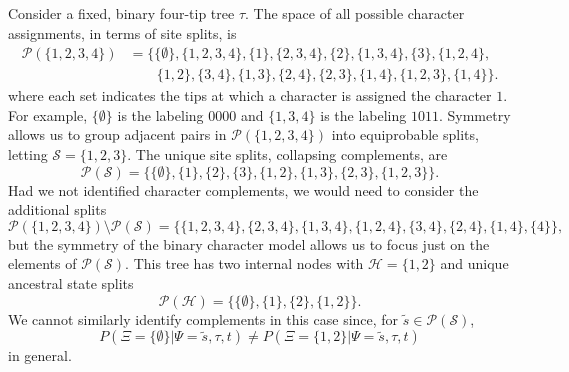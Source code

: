 \documentclass[a4paper]{article}
\newcommand{\siteSplit}{\tilde{s}}
\newcommand{\siteSplitSet}{\mathcal{S}}
\newcommand{\ancestralSplitSet}{\mathcal{H}}
\newcommand{\siteSplitRV}{\Psi}
\newcommand{\ancestralSplitRV}{\Xi}
\begin{document}
Consider a fixed, binary four-tip tree $\tau$.
The space of all possible character assignments, in terms of site splits, is
\begin{align*}
\mathcal{P}(\{1,2,3,4\}) &= \{\{\emptyset\}, \{1,2,3,4\}, \{1\}, \{2,3,4\}, \{2\}, \{1,3,4\}, \{3\}, \{1,2,4\}, \\
                         &\qquad \{1,2\}, \{3,4\}, \{1,3\}, \{2,4\}, \{2,3\}, \{1,4\}, \{1,2,3\}, \{1,4\}\}.
\end{align*}
where each set indicates the tips at which a character is assigned the character $1$.
For example, $\{\emptyset\}$ is the labeling $0000$ and $\{1,3,4\}$ is the labeling $1011$.
Symmetry allows us to group adjacent pairs in $\mathcal{P}(\{1,2,3,4\})$ into equiprobable splits, letting $\siteSplitSet=\{1,2,3\}$.
The unique site splits, collapsing complements, are
$$
\mathcal{P}(\siteSplitSet) = \{\{\emptyset\}, \{1\}, \{2\}, \{3\}, \{1,2\}, \{1,3\}, \{2,3\}, \{1,2,3\}\}.
$$
Had we not identified character complements, we would need to consider the additional splits
$$
\mathcal{P}(\{1,2,3,4\}) \setminus \mathcal{P}(\siteSplitSet) = \{\{1,2,3,4\}, \{2,3,4\}, \{1,3,4\}, \{1,2,4\}, \{3,4\}, \{2,4\}, \{1,4\}, \{4\}\},
$$
but the symmetry of the binary character model allows us to focus just on the elements of $\mathcal{P}(\siteSplitSet)$.
This tree has two internal nodes with $\ancestralSplitSet=\{1,2\}$ and unique ancestral state splits
$$
\mathcal{P}(\ancestralSplitSet) = \{\{\emptyset\}, \{1\}, \{2\}, \{1,2\}\}.
$$
We cannot similarly identify complements in this case since, for $\siteSplit\in\mathcal{P}(\siteSplitSet)$,
$$
P(\ancestralSplitRV=\{\emptyset\}|\siteSplitRV=\siteSplit, \tau, t)\neq P(\ancestralSplitRV=\{1,2\}|\siteSplitRV=\siteSplit, \tau, t)
$$
in general.
\end{document}
